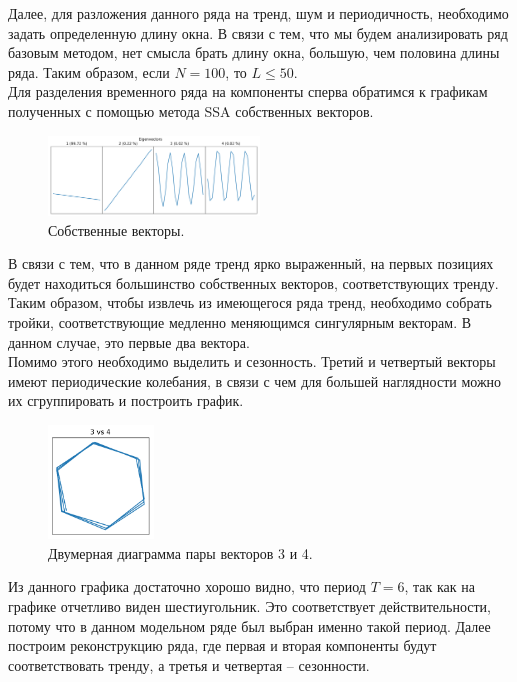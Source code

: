 \documentclass[specialist,
			   substylefile = spbu_report.rtx,
			   subf,href,colorlinks=true, 12pt]{disser}
\begin{document}
Далее, для разложения данного ряда на тренд, шум и периодичность, необходимо задать определенную длину окна. В связи с тем, что мы будем анализировать ряд базовым методом, нет смысла брать длину окна, большую, чем половина длины ряда. Таким образом, если $N = 100$, то $L \leq 50$.\\

Для разделения временного ряда на компоненты сперва обратимся к графикам полученных с помощью метода SSA собственных векторов.

\begin{figure}[H]
	\centering
	\includegraphics[width=0.5\textwidth]{mpy_vectors}
	\caption{Собственные векторы.}
	\label{mpy_vectors}
\end{figure}

В связи с тем, что в данном ряде тренд ярко выраженный, на первых позициях будет находиться большинство собственных векторов, соответствующих тренду. Таким образом, чтобы извлечь из имеющегося ряда тренд, необходимо собрать тройки, соответствующие медленно меняющимся сингулярным векторам. В данном случае, это первые два вектора.\\

Помимо этого необходимо выделить и сезонность. Третий и четвертый векторы имеют периодические колебания, в связи с чем для большей наглядности можно их сгруппировать и построить график.

\begin{figure}[H]
	\centering
	\includegraphics[width=0.25\textwidth]{mpy_pairs}
	\caption{Двумерная диаграмма пары векторов 3 и 4.}
	\label{mpy_pairs}
\end{figure}

Из данного графика достаточно хорошо видно, что период $T = 6$, так как на графике отчетливо виден шестиугольник. Это соответствует действительности, потому что в данном модельном ряде был выбран именно такой период. Далее построим реконструкцию ряда, где первая и вторая компоненты будут соответствовать тренду, а третья и четвертая – сезонности. 
\end{document}
